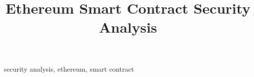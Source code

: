 \documentclass[conference]{IEEEtran}
\begin{document}
\title{Ethereum Smart Contract Security Analysis}

\author{
}

\maketitle

\def\code#1{\texttt{#1}}



\begin{IEEEkeywords}
    security analysis, ethereum, smart contract
\end{IEEEkeywords}

 

   



 


\balance

\end{document}
